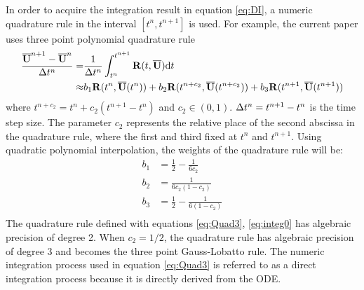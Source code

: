 \documentclass[preprint,12pt]{elsarticle}
\begin{document}
In order to acquire the integration result in equation
\eqref{eq:DI}, a numeric quadrature rule in the interval
$[t^n, t^{n+1}]$ is used. For example, the current paper
uses three point polynomial quadrature rule
\begin{equation}
    \label{eq:Quad3}
    \begin{aligned}
        \frac{\overline{\mathbf{U}}^{n+1} - \overline{\mathbf{U}}^{n}}{\mathrm\Delta t^n} = & \frac{1}{\mathrm\Delta t^n}
        \int_{t^n}^{t^{n+1}}{
        \mathbf{R}(t, \overline{\mathbf{U}}) \dd t
        }                                                           \\ \approx &
        b_1\mathbf{R}(t^n, \overline{\mathbf{U}}(t^n))
        +
        b_2\mathbf{R}(t^{n+c_2}, \overline{\mathbf{U}}(t^{n+c_2}))
        +
        b_3\mathbf{R}(t^{n+1}, \overline{\mathbf{U}}(t^{n+1}))
    \end{aligned}
\end{equation}
where $t^{n+c_2} = t^{n} + c_2 (t^{n+1} - t^n)$ and $c_2\in(0,1)$.
$\mathrm\Delta t^n=t^{n+1} - t^n$ is
the time step size.
The parameter $c_2$ represents the relative place of the second abscissa
in the quadrature rule, where the first and third fixed at $t^{n}$ and $t^{n + 1}$.
Using quadratic polynomial interpolation,
the weights of the quadrature rule will be:
\begin{equation}
    \begin{aligned}
        b_1 & = \frac{1}{2} - \frac{1}{6{c_2}}     \\
        b_2 & = \frac{1}{6{c_2}(1-{c_2})}          \\
        b_3 & = \frac{1}{2} - \frac{1}{6(1-{c_2})} \\
    \end{aligned}
    \label{eq:integ0}
\end{equation}
The quadrature rule defined with
equations \eqref{eq:Quad3}, \eqref{eq:integ0} has algebraic precision
of degree 2. When $c_2=1/2$, the quadrature rule has algebraic precision of
degree 3 and becomes the three point Gauss-Lobatto rule.
The numeric integration process used in equation \eqref{eq:Quad3}
is referred to as a direct integration process because it is
directly derived from the ODE.
\end{document}
